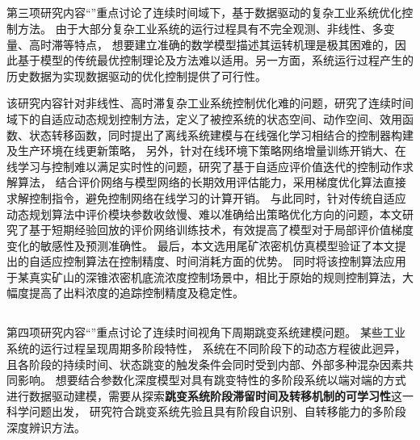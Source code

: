\subsection{\TitlechapterIII}
第三项研究内容“\TitlechapterIII”重点讨论了连续时间域下，基于数据驱动的复杂工业系统优化控制方法。
由于大部分复杂工业系统的运行过程具有不完全观测、非线性、多变量、高时滞等特点，
想要建立准确的数学模型描述其运转机理是极其困难的，因此基于模型的传统最优控制理论及方法难以适用。另一方面，系统运行过程产生的历史数据为实现数据驱动的优化控制提供了可行性。

该研究内容针对非线性、高时滞复杂工业系统控制优化难的问题，研究了连续时间域下的自适应动态规划控制方法，定义了被控系统的状态空间、动作空间、效用函数、状态转移函数，同时提出了离线系统建模与在线强化学习相结合的控制器构建及生产环境在线更新策略，
另外，针对在线环境下策略网络增量训练开销大、在线学习与控制难以满足实时性的问题，研究了基于自适应评价值迭代的控制动作求解算法，
结合评价网络与模型网络的长期效用评估能力，采用梯度优化算法直接求解控制指令，避免控制网络在线学习的计算开销。
与此同时，针对传统自适应动态规划算法中评价模块参数收敛慢、难以准确给出策略优化方向的问题，本文研究了基于短期经验回放的评价网络训练技术，有效提高了模型对于局部评价值梯度变化的敏感性及预测准确性。
最后，本文选用尾矿浓密机仿真模型验证了本文提出的自适应控制算法在控制精度、时间消耗方面的优势。
同时将该控制算法应用于某真实矿山的深锥浓密机底流浓度控制场景中，相比于原始的规则控制算法，大幅度提高了出料浓度的追踪控制精度及稳定性。

\subsection{\TitlechapterIV}


第四项研究内容“\TitlechapterIV”重点讨论了连续时间视角下周期跳变系统建模问题。
某些工业系统的运行过程呈现周期多阶段特性，
系统在不同阶段下的动态方程彼此迥异，且各阶段的持续时间、状态跳变的触发条件会同时受到内部、外部多种混杂因素共同影响。
想要结合参数化深度模型对具有跳变特性的多阶段系统以端对端的方式进行数据驱动建模，需要从探索\textbf{跳变系统阶段滞留时间及转移机制的可学习性}这一科学问题出发，
研究符合跳变系统先验且具有阶段自识别、自转移能力的多阶段深度辨识方法。

